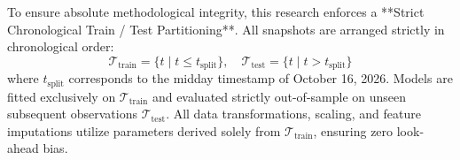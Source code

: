 To ensure absolute methodological integrity, this research enforces a **Strict Chronological Train / Test Partitioning**. All snapshots are arranged strictly in chronological order:
\begin{equation}
    \mathcal{T}_{\text{train}} = \{t \mid t \le t_{\text{split}}\}, \quad \mathcal{T}_{\text{test}} = \{t \mid t > t_{\text{split}}\}
\end{equation}
where $t_{\text{split}}$ corresponds to the midday timestamp of October 16, 2026. Models are fitted exclusively on $\mathcal{T}_{\text{train}}$ and evaluated strictly out-of-sample on unseen subsequent observations $\mathcal{T}_{\text{test}}$. All data transformations, scaling, and feature imputations utilize parameters derived solely from $\mathcal{T}_{\text{train}}$, ensuring zero look-ahead bias.
